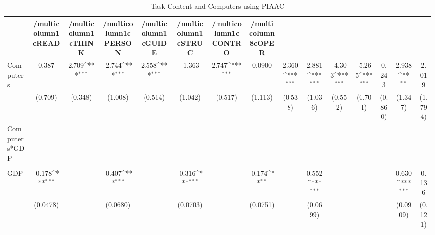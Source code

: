 \begin{table}[htbp]\centering
\def\sym#1{\ifmmode^{#1}\else\(^{#1}\)\fi}
\caption{Task Content and Computers using PIAAC}
\begin{tabular}{l*{14}{c}}
\hline\hline
            &/multicolumn{1}{c}{READ}&/multicolumn{1}{c}{THINK}&/multicolumn{1}{c}{PERSON}&/multicolumn{1}{c}{GUIDE}&/multicolumn{1}{c}{STRUC}&/multicolumn{1}{c}{CONTRO}&/multicolumn{8}{c}{OPER}                                                                                                                                                       \\
\hline
Computers   &       0.387         &       2.709\sym{***}&      -2.744\sym{***}&       2.558\sym{***}&      -1.363         &       2.747\sym{***}&      0.0900         &       2.360\sym{***}&       2.881\sym{***}&      -4.303\sym{***}&      -5.265\sym{***}&       0.243         &       2.938\sym{**} &       2.019         \\
            &     (0.709)         &     (0.348)         &     (1.008)         &     (0.514)         &     (1.042)         &     (0.517)         &     (1.113)         &     (0.538)         &     (1.036)         &     (0.552)         &     (0.701)         &     (0.860)         &     (1.347)         &     (1.794)         \\
[1em]
Computers*GDP&                     &                     &                     &                     &                     &                     &                     &                     &                     &                     &                     &                     &                     &                     \\
            &                     &                     &                     &                     &                     &                     &                     &                     &                     &                     &                     &                     &                     &                     \\
[1em]
GDP         &      -0.178\sym{***}&                     &      -0.407\sym{***}&                     &      -0.316\sym{***}&                     &      -0.174\sym{**} &                     &       0.552\sym{***}&                     &                     &                     &       0.630\sym{***}&       0.136         \\
            &    (0.0478)         &                     &    (0.0680)         &                     &    (0.0703)         &                     &    (0.0751)         &                     &    (0.0699)         &                     &                     &                     &    (0.0909)         &     (0.121)         \\

\end{tabular}
\end{table}

